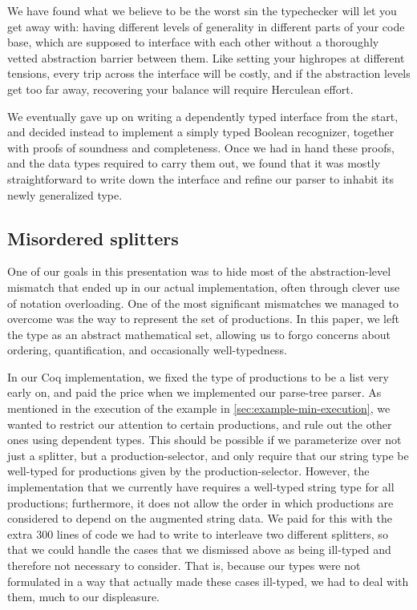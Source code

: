     We have found what we believe to be the worst sin the typechecker will let you get away with: having different levels of generality in different parts of your code base, which are supposed to interface with each other without a thoroughly vetted abstraction barrier between them.  Like setting your highropes at different tensions, every trip across the interface will be costly, and if the abstraction levels get too far away, recovering your balance will require Herculean effort.

    We eventually gave up on writing a dependently typed interface from the start, and decided instead to implement a simply typed Boolean recognizer, together with proofs of soundness and completeness.  Once we had in hand these proofs, and the data types required to carry them out, we found that it was mostly straightforward to write down the interface and refine our parser to inhabit its newly generalized type.

  \subsection{Misordered splitters} \label{sec:misordered-splitters}
    One of our goals in this presentation was to hide most of the abstraction-level mismatch that ended up in our actual implementation, often through clever use of notation overloading.  One of the most significant mismatches we managed to overcome was the way to represent the set of productions.  In this paper, we left the type as an abstract mathematical set, allowing us to forgo concerns about ordering, quantification, and occasionally well-typedness.

    In our Coq implementation, we fixed the type of productions to be a list very early on, and paid the price when we implemented our parse-tree parser.  As mentioned in the execution of the example in \autoref{sec:example-min-execution}, we wanted to restrict our attention to certain productions, and rule out the other ones using dependent types.  This should be possible if we parameterize over not just a splitter, but a production-selector, and only require that our string type be well-typed for productions given by the production-selector.  However, the implementation that we currently have requires a well-typed string type for all productions; furthermore, it does not allow the order in which productions are considered to depend on the augmented string data.  We paid for this with the extra 300 lines of code we had to write to interleave two different splitters, so that we could handle the cases that we dismissed above as being ill-typed and therefore not necessary to consider.  That is, because our types were not formulated in a way that actually made these cases ill-typed, we had to deal with them, much to our displeasure.

